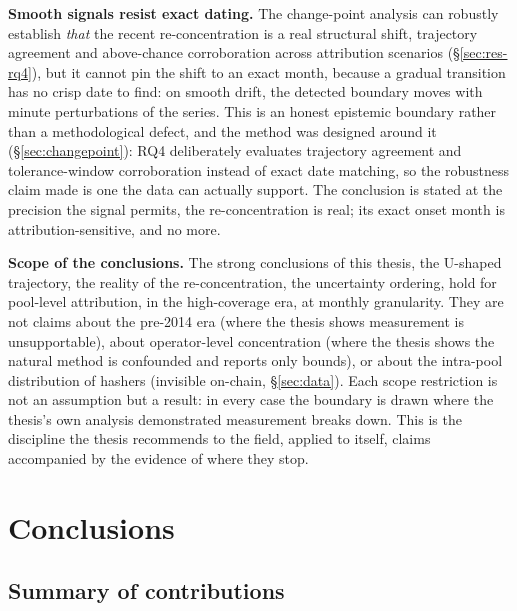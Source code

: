 \documentclass[logo,msc]{infthesis}           %
\begin{document}
\textbf{Smooth signals resist exact dating.} The change-point analysis can
robustly establish \emph{that} the recent re-concentration is a real
structural shift, trajectory agreement and above-chance corroboration
across attribution scenarios (\S\ref{sec:res-rq4}), but it cannot pin the
shift to an exact month, because a gradual transition has no crisp date to
find: on smooth drift, the detected boundary moves with minute perturbations
of the series. This is an honest epistemic boundary rather than a
methodological defect, and the method was designed around it
(\S\ref{sec:changepoint}): RQ4 deliberately evaluates trajectory agreement
and tolerance-window corroboration instead of exact date matching, so the
robustness claim made is one the data can actually support. The conclusion is
stated at the precision the signal permits, the re-concentration is real;
its exact onset month is attribution-sensitive, and no more.

\textbf{Scope of the conclusions.} The strong conclusions of this thesis,
the U-shaped trajectory, the reality of the re-concentration, the uncertainty
ordering, hold for pool-level attribution, in the high-coverage era, at
monthly granularity. They are not claims about the pre-2014 era (where the
thesis shows measurement is unsupportable), about operator-level concentration
(where the thesis shows the natural method is confounded and reports only
bounds), or about the intra-pool distribution of hashers (invisible on-chain,
\S\ref{sec:data}). Each scope restriction is not an assumption but a result:
in every case the boundary is drawn where the thesis's own analysis
demonstrated measurement breaks down. This is the discipline the thesis
recommends to the field, applied to itself, claims accompanied by the
evidence of where they stop.


\chapter{Conclusions}
\label{ch:conclusions}

\section{Summary of contributions}
\label{sec:conc-summary}
\end{document}

